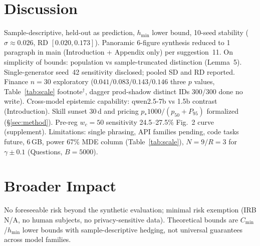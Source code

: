 \documentclass[10pt]{article}
\begin{document}
\section{Discussion}\label{sec:disc}
Sample-descriptive, held-out as prediction, $h_{\min}$ lower bound, 10-seed stability ($\sigma{\approx}0.026$, RD $[0.020,0.173]$). Panoramic 6-figure synthesis reduced to 1 paragraph in main (Introduction + Appendix only) per suggestion~11. On simplicity of bounds: population vs sample-truncated distinction (Lemma~5). Single-generator seed~42 sensitivity disclosed; pooled SD and RD reported. Finance $n{=}30$ exploratory ($0.041/0.083/0.143/0.146$ three $p$ values, Table~\ref{tab:scale} footnote$^\dagger$, dagger prod-shadow distinct IDs 300/300 done no write). Cross-model epistemic capability: qwen2.5-7b vs 1.5b contrast (Introduction). Skill sunset 30\,d and pricing $p_{*}1000/(p_{50}+P_{95})$ formalized (\S\ref{sec:method}). Pre-reg $w_c{=}50$ sensitivity 24.5--27.5\% Fig.~2 curve (supplement). Limitations: single phrasing, API families pending, code tasks future, 6\,GB, power 67\% MDE column (Table~\ref{tab:scale}), $N{=}9/R{=}3$ for $\gamma\pm0.1$ (Questions, $B{=}5000$).

\section*{Broader Impact}
No foreseeable risk beyond the synthetic evaluation; minimal risk exemption (IRB N/A, no human subjects, no privacy-sensitive data). Theoretical bounds are $C_{\min}$/$h_{\min}$ lower bounds with sample-descriptive hedging, not universal guarantees across model families.
\end{document}
